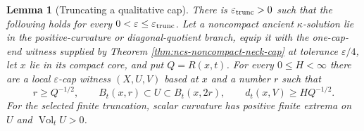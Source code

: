 \documentclass[10pt]{coll-l}
\newtheorem{lemma}[theorem]{Lemma}
\theoremstyle{definition}
\theoremstyle{remark}
\numberwithin{section}{chapter}
\numberwithin{equation}{chapter}
\newcommand{\Vol}{\operatorname{Vol}}
\begin{document}
\begin{lemma}[Truncating a qualitative cap]
\label{lem:ncs-cap-truncation-sandwich}
There is $\varepsilon_{\rm trunc}>0$ such that the following holds for every
$0<\varepsilon\leq\varepsilon_{\rm trunc}$.  Let a noncompact ancient
$\kappa$-solution lie in the positive-curvature or diagonal-quotient
branch, equip it with the one-cap-end witness supplied by Theorem
\ref{thm:ncs-noncompact-neck-cap} at tolerance $\varepsilon/4$, let $x$
lie in its compact core, and put $Q=R(x,t)$.  For every $0\leq H<\infty$ there
are a local $\varepsilon$-cap witness $(X,U,V)$ based at $x$ and a number
$r$ such that
\begin{equation}
 r\geq Q^{-1/2},\qquad
 B_t(x,r)\subset U\subset B_t(x,2r),\qquad
 d_t(x,V)\geq H Q^{-1/2}.                             \label{eq:ncs-cap-truncation-sandwich}
\end{equation}
For the selected finite truncation, scalar curvature has positive finite
extrema on $U$ and $\Vol_tU>0$.
\end{lemma}
\end{document}
